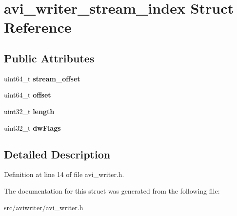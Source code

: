 \hypertarget{structavi__writer__stream__index}{\section{avi\-\_\-writer\-\_\-stream\-\_\-index Struct Reference}
\label{structavi__writer__stream__index}
}
\subsection*{Public Attributes}
\begin{DoxyCompactItemize}
\item 
\hypertarget{structavi__writer__stream__index_a1c8b47e3bf026a2354d09a2c1ab6b76e}{uint64\-\_\-t {\bfseries stream\-\_\-offset}}\label{structavi__writer__stream__index_a1c8b47e3bf026a2354d09a2c1ab6b76e}

\item 
\hypertarget{structavi__writer__stream__index_abd702cfd30345692d1216b135bc8f0dd}{uint64\-\_\-t {\bfseries offset}}\label{structavi__writer__stream__index_abd702cfd30345692d1216b135bc8f0dd}

\item 
\hypertarget{structavi__writer__stream__index_ac7814b7351c96b888ccad5eb5f1b6858}{uint32\-\_\-t {\bfseries length}}\label{structavi__writer__stream__index_ac7814b7351c96b888ccad5eb5f1b6858}

\item 
\hypertarget{structavi__writer__stream__index_aee37c3956ae6bf797f45d39beaaafa76}{uint32\-\_\-t {\bfseries dw\-Flags}}\label{structavi__writer__stream__index_aee37c3956ae6bf797f45d39beaaafa76}

\end{DoxyCompactItemize}


\subsection{Detailed Description}


Definition at line 14 of file avi\-\_\-writer.\-h.



The documentation for this struct was generated from the following file\-:\begin{DoxyCompactItemize}
\item 
src/aviwriter/avi\-\_\-writer.\-h\end{DoxyCompactItemize}
